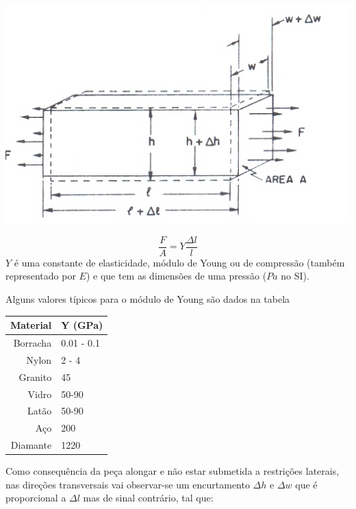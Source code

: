 \documentclass[a4paper,12pt]{article}
\begin{document}
\begin{minipage}[c]{0.6\textwidth}
\begin{center}
	\includegraphics[width=0.8\linewidth]{moduloYoung}
\label{fig:fig1}            
\end{center}
\end{minipage}
\begin{minipage}[c]{0.4\textwidth}
\begin{equation}
	\label{eq:vc}
	 \frac{F}{A}  = Y  \frac{\Delta l}{l} 
\end{equation}
$Y$ é uma constante de elasticidade, módulo de Young ou de compressão (também representado por $E$) e que tem as dimensões de uma pressão ($Pa$ no SI).
\end{minipage}

Alguns valores típicos para o módulo de Young são dados na tabela
\begin{tabular}{|r|l|}
\hline
\textbf{Material} & \textbf{Y (GPa)}\\
\hline
Borracha & 0.01 - 0.1\\
Nylon & 2 - 4 \\ %
Granito & 45 \\
Vidro & 50-90 \\
Latão & 50-90 \\
Aço  & 200 \\
Diamante  & 1220 \\
\hline
\end{tabular}

Como consequência da peça alongar e não estar submetida a restrições laterais, nas direções transversais vai observar-se um encurtamento $\Delta h$ e $\Delta w$ que é proporcional a $\Delta l$ mas de sinal contrário, tal que:
\end{document}
